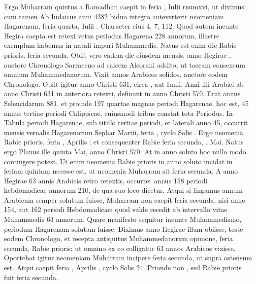 Ergo Muharram quintus
a Ramadhan caepit in feria , Iulii rnum{xvi}, ut diximus: cum tamen
Ab Iudaicus anni 4382 biduo integro anteverterit neomeniam
Hagarenam, feria quarta, Iulii .
Character eius 4, 7, 112.
Quod autem ineunte Hegira caepta est retexi vetus periodus Hagarena
228 annorum, illustre exemplum habemus in natali impuri Muhammedis.
Natus est enim  die Rabie prioris, feria secunda.
Obiit vero
eadem die eiusdem mensis, anno Hegirae , auctore Chronologo Sarraceno
ad calcem Alcorani addito, ut taceam consensum omnium
Muhammedanorum.
Vixit annos  Arabicos solidos, auctore
eodem Chronologo.
Obiit igitur anno Christi 631, circa , aut
 Iunii.
Anni illi  Arabici ab anno Christi 631 in anteriora
retexti, definunt in anno Christi 570.
Erat annus Seleucidarum 881,
et proinde 197 quartae magnae periodi Hagarenae, hoc est, 45 annus
tertiae periodi Calippicae, cuiusmodi tribus constat tota Periodus.
In
Tabula periodi Hagarenae, sub titulo tertiae periodi, et laterali anno
45, occurrit mensis vernalis Hagarenorum Sephar  Martii, feria
, cyclo Solis .
Ergo neomenia Rabie prioris, feria , Aprilis
: et consequenter  Rabie feria secunda, . Mai.
Natus
ergo Planus ille quinta Mai, anno Christi 570.
At in anno soluto
hoc nullo modo contingere potest.
Ut enim neomenia Rabie prioris
in anno soluto incidat in feriam quintam necesse est, ut neomenia
Muharram sit feria secunda.
%
A  anno Hegirae 63 annis Arabicis
retro retextis, occurret annus 158 periodi hebdomadicae annorum 210,
de qua suo loco dicetur.
Atqui si fingamus annum Arabicum semper
solutum fuisse, Muharram non caepit feria secunda, nisi anno 154, aut
162 periodi Hebdomadicae: quod valde recedit ab intervallo vitae
Muhammedis 63 annorum.
Quare manifesto sequitur ineunte Muhammedismo,
periodum Hagarenam solutam fuisse.
Diximus anno 
Hegirae illum obiisse, teste eodem Chronologo, et recepta antiquitus
Muhammedanorum opinione, feria secunda,  Rabie prioris: ut
omnino ex eo colligatur 63 annos Arabicos vixisse.
Oportebat igitur
neomeniam Muharram incipere feria secunda, ut supra ostensum est.
Atqui caepit feria , Aprilis , cyclo Solis 24.
Prionde non ,
sed  Rabie prioris fuit feria secunda.
